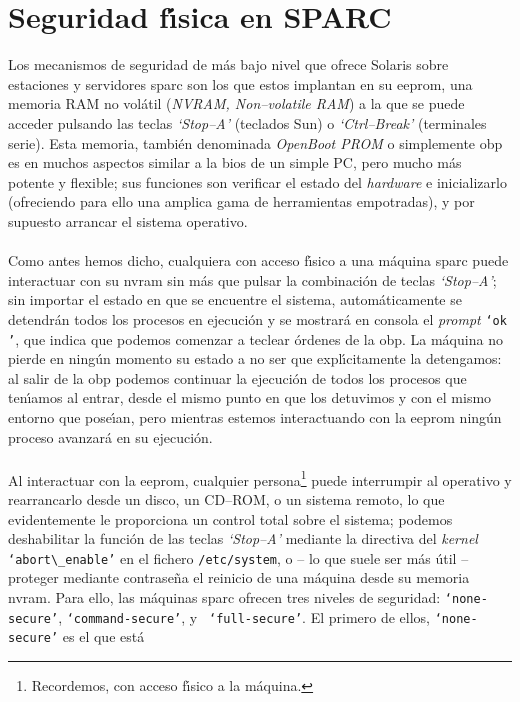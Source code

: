 \section{Seguridad f\'{\i}sica en SPARC}
Los mecanismos de seguridad de m\'as bajo nivel que ofrece Solaris sobre 
estaciones y servidores {\sc sparc} son los que estos implantan en su {\sc 
eeprom}, una memoria RAM no vol\'atil ({\it NVRAM, Non--volatile RAM}) a la que 
se puede acceder pulsando las teclas {\it `Stop--A'} (teclados Sun) o {\it 
`Ctrl--Break'} 
(terminales serie). Esta memoria, tambi\'en denominada {\it OpenBoot PROM} o 
simplemente {\sc obp} es en muchos aspectos similar a la {\sc bios} de un 
simple PC, pero mucho m\'as potente y flexible; sus funciones son verificar el 
estado del {\it hardware} e inicializarlo (ofreciendo para ello una amplica 
gama de herramientas empotradas), y por supuesto arrancar el sistema 
operativo.\\
\\Como antes hemos dicho, cualquiera con acceso f\'{\i}sico a una m\'aquina
{\sc sparc} puede interactuar con su {\sc nvram} sin m\'as que pulsar la 
combinaci\'on de teclas {\it `Stop--A'}; sin importar el estado en que se 
encuentre el sistema, autom\'aticamente se detendr\'an todos los procesos en 
ejecuci\'on y se mostrar\'a en consola el {\it prompt} {\tt `ok '}, que indica
que podemos comenzar a teclear \'ordenes de la {\sc obp}. La m\'aquina no pierde
en ning\'un momento su estado a no ser que expl\'{\i}citamente la detengamos:
al salir de la {\sc obp} podemos continuar la ejecuci\'on de todos los procesos
que ten\'{\i}amos al entrar, desde el mismo punto en que los detuvimos y con
el mismo entorno que pose\'{\i}an, pero mientras estemos interactuando con la 
{\sc eeprom} ning\'un proceso avanzar\'a en su ejecuci\'on.\\
\\Al interactuar con la {\sc eeprom}, cualquier persona\footnote{Recordemos, con
acceso f\'{\i}sico a la m\'aquina.} puede interrumpir al operativo y 
rearrancarlo desde un disco, un CD--ROM, o un sistema remoto, lo que 
evidentemente le proporciona un control total sobre el sistema; podemos 
deshabilitar la funci\'on de las teclas {\it `Stop--A'} mediante la directiva 
del {\it kernel} {\tt `abort$\_$enable'} en el fichero {\tt /etc/system}, 
o -- lo que suele ser m\'as \'util -- proteger mediante contrase\~na el reinicio
de una m\'aquina desde su memoria {\sc nvram}. Para ello, las m\'aquinas {\sc 
sparc} ofrecen tres
niveles de seguridad: {\tt `none-secure'}, {\tt `command-secure'}, y {\tt 
`full-secure'}. El primero de ellos, {\tt `none-secure'} es el que est\'a
